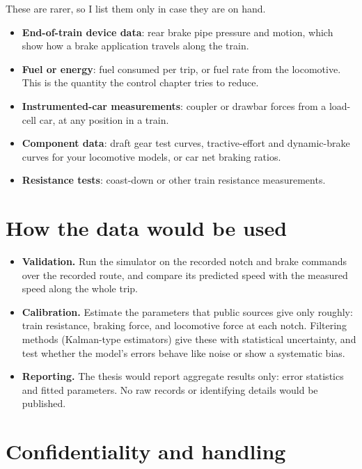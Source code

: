 \documentclass[11pt]{article}
\begin{document}
These are rarer, so I list them only in case they are on hand.
\begin{itemize}
  \item \textbf{End-of-train device data}: rear brake pipe pressure and
    motion, which show how a brake application travels along the train.
  \item \textbf{Fuel or energy}: fuel consumed per trip, or fuel rate from
    the locomotive. This is the quantity the control chapter tries to reduce.
  \item \textbf{Instrumented-car measurements}: coupler or drawbar forces
    from a load-cell car, at any position in a train.
  \item \textbf{Component data}: draft gear test curves, tractive-effort and
    dynamic-brake curves for your locomotive models, or car net braking ratios.
  \item \textbf{Resistance tests}: coast-down or other train resistance
    measurements.
\end{itemize}

\section*{How the data would be used}

\begin{itemize}
  \item \textbf{Validation.} Run the simulator on the recorded notch and brake
    commands over the recorded route, and compare its predicted speed with
    the measured speed along the whole trip.
  \item \textbf{Calibration.} Estimate the parameters that public sources give
    only roughly: train resistance, braking force, and locomotive force at
    each notch. Filtering methods (Kalman-type estimators) give these with
    statistical uncertainty, and test whether the model's errors behave like
    noise or show a systematic bias.
  \item \textbf{Reporting.} The thesis would report aggregate results only:
    error statistics and fitted parameters. No raw records or identifying
    details would be published.
\end{itemize}

\section*{Confidentiality and handling}
\end{document}
